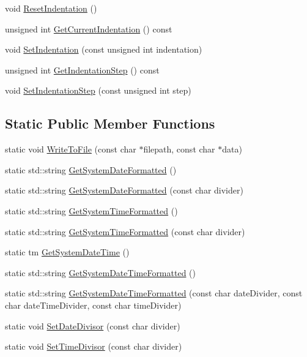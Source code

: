 \begin{DoxyCompactItemize}
\item 
void \mbox{\hyperlink{classutl_1_1_file_logger_a5cc294f87e85875a5ec420bf4b60f944}{Reset\+Indentation}} ()
\item 
unsigned int \mbox{\hyperlink{classutl_1_1_file_logger_ad9a89d0c4453cff4d48253d09020daf8}{Get\+Current\+Indentation}} () const
\item 
void \mbox{\hyperlink{classutl_1_1_file_logger_ae8ce6a73b455cf5b865121ded27813d7}{Set\+Indentation}} (const unsigned int indentation)
\item 
unsigned int \mbox{\hyperlink{classutl_1_1_file_logger_a309e5f94ba4c5ea6e41bb7c600682e38}{Get\+Indentation\+Step}} () const
\item 
void \mbox{\hyperlink{classutl_1_1_file_logger_a69d64f348cae396095f6b4cff1955636}{Set\+Indentation\+Step}} (const unsigned int step)
\end{DoxyCompactItemize}
\subsection*{Static Public Member Functions}
\begin{DoxyCompactItemize}
\item 
static void \mbox{\hyperlink{classutl_1_1_file_logger_a05b05806b51da47772c9af14c4dabf41}{Write\+To\+File}} (const char $\ast$filepath, const char $\ast$data)
\item 
static std\+::string \mbox{\hyperlink{classutl_1_1_file_logger_a1346d06e73a06269bc75dd8a7f007f7a}{Get\+System\+Date\+Formatted}} ()
\item 
static std\+::string \mbox{\hyperlink{classutl_1_1_file_logger_a6d86887d521a139f467cd8a68170a56b}{Get\+System\+Date\+Formatted}} (const char divider)
\item 
static std\+::string \mbox{\hyperlink{classutl_1_1_file_logger_a5333d4596df47edfe4e625aca913d89b}{Get\+System\+Time\+Formatted}} ()
\item 
static std\+::string \mbox{\hyperlink{classutl_1_1_file_logger_ac5bee0b767adbe81ad20ce93b750c971}{Get\+System\+Time\+Formatted}} (const char divider)
\item 
static tm \mbox{\hyperlink{classutl_1_1_file_logger_ac22f71f18b679450b591edc05baa8956}{Get\+System\+Date\+Time}} ()
\item 
static std\+::string \mbox{\hyperlink{classutl_1_1_file_logger_a3287f373cc5a9766637eaad183d7eb88}{Get\+System\+Date\+Time\+Formatted}} ()
\item 
static std\+::string \mbox{\hyperlink{classutl_1_1_file_logger_a6819ec578b8a8605d3b3f47d91a30a3f}{Get\+System\+Date\+Time\+Formatted}} (const char date\+Divider, const char date\+Time\+Divider, const char time\+Divider)
\item 
static void \mbox{\hyperlink{classutl_1_1_file_logger_a273c189bbb9dc395462c01a63e318b7c}{Set\+Date\+Divisor}} (const char divider)
\item 
static void \mbox{\hyperlink{classutl_1_1_file_logger_a4a683c7f8d2a08e42be4688f8f117a05}{Set\+Time\+Divisor}} (const char divider)
\end{DoxyCompactItemize}


